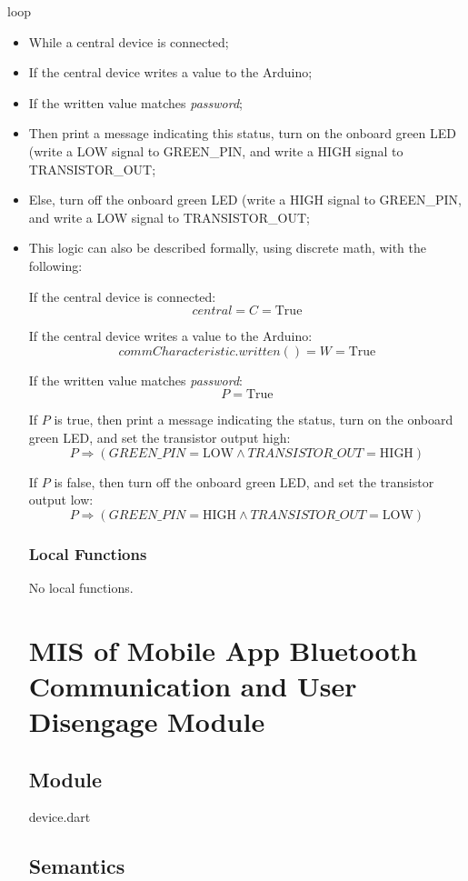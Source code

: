 \documentclass[12pt, titlepage]{article}
\begin{document}
\noindent loop
\begin{itemize}
\item While a central device is connected;
\item If the central device writes a value to the Arduino;
\item If the written value matches \textit{password};
\item Then print a message indicating this status, turn on the onboard green LED (write a LOW signal to GREEN\_PIN, and write a HIGH signal to TRANSISTOR\_OUT;
\item Else, turn off the onboard green LED (write a HIGH signal to GREEN\_PIN, and write a LOW signal to TRANSISTOR\_OUT;
\item This logic can also be described formally, using discrete math, with the following:

If the central device is connected:
$$central = C = \text{True}$$

If the central device writes a value to the Arduino:
$$commCharacteristic.written() = W = \text{True}$$

If the written value matches \textit{password}:
$$P = \text{True}$$

If $P$ is true, then print a message indicating the status, turn on the onboard green LED, and set the transistor output high:
$$P \Rightarrow (GREEN\_PIN = \text{LOW} \land TRANSISTOR\_OUT = \text{HIGH})$$

If $P$ is false, then turn off the onboard green LED, and set the transistor output low:
$$P \Rightarrow (GREEN\_PIN = \text{HIGH} \land TRANSISTOR\_OUT = \text{LOW})$$

\subsubsection{Local Functions}

No local functions.




\section{MIS of Mobile App Bluetooth Communication and User Disengage Module} \label{mHD}

\subsection{Module}
device.dart

\subsection{Semantics}


\end{itemize}
\end{document}
